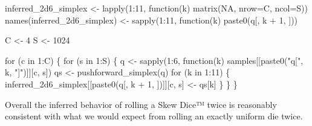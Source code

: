 \documentclass[
  letterpaper,
  DIV=11,
  numbers=noendperiod]{scrartcl}
\newenvironment{Shaded}{\begin{snugshade}}{\end{snugshade}}
\newcommand{\AttributeTok}[1]{\textcolor[rgb]{0.40,0.45,0.13}{#1}}
\newcommand{\ConstantTok}[1]{\textcolor[rgb]{0.56,0.35,0.01}{#1}}
\newcommand{\ControlFlowTok}[1]{\textcolor[rgb]{0.00,0.23,0.31}{#1}}
\newcommand{\DecValTok}[1]{\textcolor[rgb]{0.68,0.00,0.00}{#1}}
\newcommand{\FunctionTok}[1]{\textcolor[rgb]{0.28,0.35,0.67}{#1}}
\newcommand{\NormalTok}[1]{\textcolor[rgb]{0.00,0.23,0.31}{#1}}
\newcommand{\OtherTok}[1]{\textcolor[rgb]{0.00,0.23,0.31}{#1}}
\newcommand{\SpecialCharTok}[1]{\textcolor[rgb]{0.37,0.37,0.37}{#1}}
\newcommand{\StringTok}[1]{\textcolor[rgb]{0.13,0.47,0.30}{#1}}
\begin{document}
\begin{Shaded}
\begin{Highlighting}[]
\NormalTok{inferred\_2d6\_simplex }\OtherTok{\textless{}{-}} \FunctionTok{lapply}\NormalTok{(}\DecValTok{1}\SpecialCharTok{:}\DecValTok{11}\NormalTok{,}
                               \ControlFlowTok{function}\NormalTok{(k) }\FunctionTok{matrix}\NormalTok{(}\ConstantTok{NA}\NormalTok{, }\AttributeTok{nrow=}\NormalTok{C, }\AttributeTok{ncol=}\NormalTok{S))}
\FunctionTok{names}\NormalTok{(inferred\_2d6\_simplex) }\OtherTok{\textless{}{-}} \FunctionTok{sapply}\NormalTok{(}\DecValTok{1}\SpecialCharTok{:}\DecValTok{11}\NormalTok{,}
                                      \ControlFlowTok{function}\NormalTok{(k) }\FunctionTok{paste0}\NormalTok{(}\StringTok{\textquotesingle{}q[\textquotesingle{}}\NormalTok{, k }\SpecialCharTok{+} \DecValTok{1}\NormalTok{, }\StringTok{\textquotesingle{}]\textquotesingle{}}\NormalTok{))}

\NormalTok{C }\OtherTok{\textless{}{-}} \DecValTok{4}
\NormalTok{S }\OtherTok{\textless{}{-}} \DecValTok{1024}

\ControlFlowTok{for}\NormalTok{ (c }\ControlFlowTok{in} \DecValTok{1}\SpecialCharTok{:}\NormalTok{C) \{}
  \ControlFlowTok{for}\NormalTok{ (s }\ControlFlowTok{in} \DecValTok{1}\SpecialCharTok{:}\NormalTok{S) \{}
\NormalTok{    q }\OtherTok{\textless{}{-}} \FunctionTok{sapply}\NormalTok{(}\DecValTok{1}\SpecialCharTok{:}\DecValTok{6}\NormalTok{, }\ControlFlowTok{function}\NormalTok{(k)}
\NormalTok{                     samples[[}\FunctionTok{paste0}\NormalTok{(}\StringTok{"q["}\NormalTok{, k, }\StringTok{"]"}\NormalTok{)]][c, s])}
\NormalTok{    qs }\OtherTok{\textless{}{-}} \FunctionTok{pushforward\_simplex}\NormalTok{(q)}
    \ControlFlowTok{for}\NormalTok{ (k }\ControlFlowTok{in} \DecValTok{1}\SpecialCharTok{:}\DecValTok{11}\NormalTok{) \{}
\NormalTok{      inferred\_2d6\_simplex[[}\FunctionTok{paste0}\NormalTok{(}\StringTok{\textquotesingle{}q[\textquotesingle{}}\NormalTok{, k }\SpecialCharTok{+} \DecValTok{1}\NormalTok{, }\StringTok{\textquotesingle{}]\textquotesingle{}}\NormalTok{)]][c, s] }\OtherTok{\textless{}{-}}\NormalTok{ qs[k]}
\NormalTok{    \}}
\NormalTok{  \}}
\NormalTok{\}}
\end{Highlighting}
\end{Shaded}

Overall the inferred behavior of rolling a Skew Dice™ twice is
reasonably consistent with what we would expect from rolling an exactly
uniform die twice.
\end{document}
